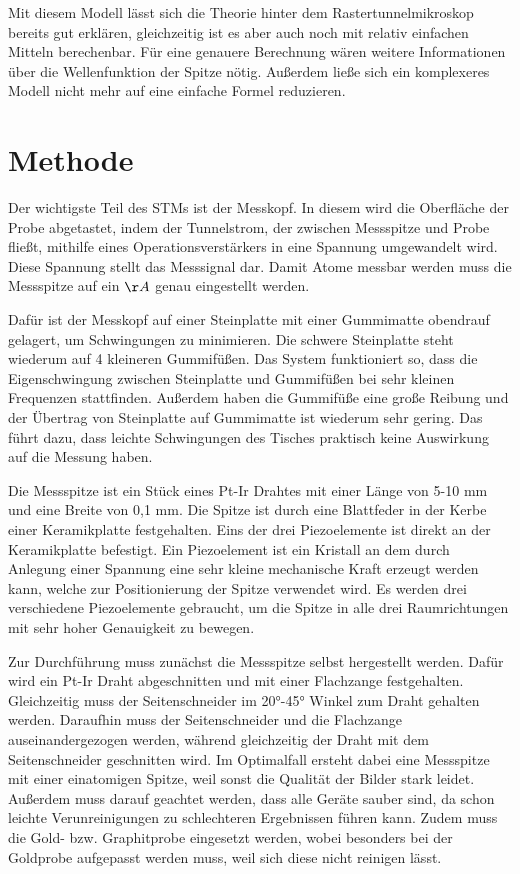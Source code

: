 \documentclass[
	a4paper,
	12pt,
	pagesize,
	ngerman
]{scrartcl}
\begin{document}
Mit diesem Modell lässt sich die Theorie hinter dem Rastertunnelmikroskop bereits gut erklären, gleichzeitig ist es aber auch noch mit relativ einfachen Mitteln berechenbar. Für eine genauere Berechnung wären weitere Informationen über die Wellenfunktion der Spitze nötig. Außerdem ließe sich ein komplexeres Modell nicht mehr auf eine einfache Formel reduzieren.

\newpage


\section{Methode}
Der wichtigste Teil des STMs ist der Messkopf. In diesem wird die Oberfläche der Probe abgetastet, indem der Tunnelstrom, der zwischen Messspitze und Probe fließt, mithilfe eines Operationsverstärkers in eine Spannung umgewandelt wird. Diese Spannung stellt das Messsignal dar. Damit Atome messbar werden muss die Messspitze auf ein $\AA$ genau eingestellt werden. 

Dafür ist der Messkopf auf einer Steinplatte mit einer Gummimatte obendrauf gelagert, um Schwingungen zu minimieren. Die schwere Steinplatte steht wiederum auf 4 kleineren Gummifüßen. 
Das System funktioniert so, dass die Eigenschwingung zwischen Steinplatte und Gummifüßen bei sehr kleinen Frequenzen stattfinden. Außerdem haben die Gummifüße eine große Reibung und der Übertrag von Steinplatte auf Gummimatte ist wiederum sehr gering. Das führt dazu, dass leichte Schwingungen des Tisches praktisch keine Auswirkung auf die Messung haben.

Die Messspitze ist ein Stück eines Pt-Ir Drahtes mit einer Länge von 5-10 mm und eine Breite von 0,1 mm. Die Spitze ist durch eine Blattfeder in der Kerbe einer Keramikplatte festgehalten. Eins der drei Piezoelemente ist direkt an der Keramikplatte befestigt. Ein Piezoelement ist ein Kristall an dem durch Anlegung einer Spannung eine sehr kleine mechanische Kraft erzeugt werden kann, welche zur Positionierung der Spitze verwendet wird. Es werden drei verschiedene Piezoelemente gebraucht, um die Spitze in alle drei Raumrichtungen mit sehr hoher Genauigkeit zu bewegen.

Zur Durchführung muss zunächst die Messspitze selbst hergestellt werden. Dafür wird ein Pt-Ir Draht abgeschnitten und mit einer Flachzange festgehalten. Gleichzeitig muss der Seitenschneider im 20°-45° Winkel zum Draht gehalten werden. Daraufhin muss der Seitenschneider und die Flachzange auseinandergezogen werden, während gleichzeitig der Draht mit dem Seitenschneider geschnitten wird. Im Optimalfall ersteht dabei eine Messspitze mit einer einatomigen Spitze, weil sonst die Qualität der Bilder stark leidet. Außerdem muss darauf geachtet werden, dass alle Geräte sauber sind, da schon leichte Verunreinigungen zu schlechteren Ergebnissen führen kann. Zudem muss die Gold- bzw. Graphitprobe eingesetzt werden, wobei besonders bei der Goldprobe aufgepasst werden muss, weil sich diese nicht reinigen lässt.
\end{document}
